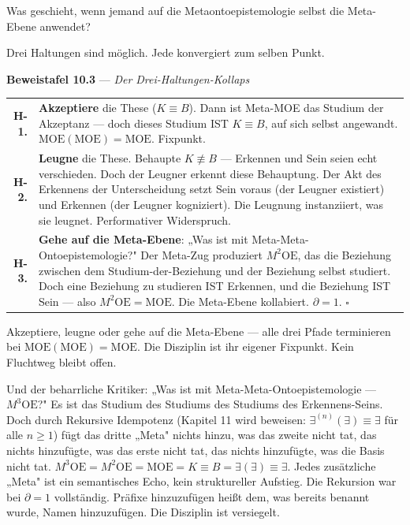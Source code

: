 \documentclass[10pt, openany, oneside]{book}
\renewcommand{\footnotesize}{\fontsize{8.5}{11}\selectfont}
\begin{document}
\vspace{1em}

\noindent Was geschieht, wenn jemand auf die Metaontoepistemologie selbst die Meta-Ebene anwendet?

Drei Haltungen sind möglich. Jede konvergiert zum selben Punkt.

\vspace{0.5em}

\textbf{Beweistafel 10.3} --- \textit{Der Drei-Haltungen-Kollaps}

\vspace{0.5em}

{\footnotesize
\noindent\begin{tabular}{r p{}}
\textbf{H-1.} & \textbf{Akzeptiere} die These ($K \equiv B$). Dann ist Meta-MOE das Studium der Akzeptanz --- doch dieses Studium IST $K \equiv B$, auf sich selbst angewandt. $\text{MOE}(\text{MOE}) = \text{MOE}$. Fixpunkt. \\[0.3em]
\textbf{H-2.} & \textbf{Leugne} die These. Behaupte $K \not\equiv B$ --- Erkennen und Sein seien echt verschieden. Doch der Leugner erkennt diese Behauptung. Der Akt des Erkennens der Unterscheidung setzt Sein voraus (der Leugner existiert) und Erkennen (der Leugner kogniziert). Die Leugnung instanziiert, was sie leugnet. Performativer Widerspruch. \\[0.3em]
\textbf{H-3.} & \textbf{Gehe auf die Meta-Ebene}: „Was ist mit Meta-Meta-Ontoepistemologie?" Der Meta-Zug produziert $M^2\text{OE}$, das die Beziehung zwischen dem Studium-der-Beziehung und der Beziehung selbst studiert. Doch eine Beziehung zu studieren IST Erkennen, und die Beziehung IST Sein --- also $M^2\text{OE} = \text{MOE}$. Die Meta-Ebene kollabiert. $\partial = 1$. $\square$ \\[0.3em]
\end{tabular}
}

\vspace{0.8em}

\noindent Akzeptiere, leugne oder gehe auf die Meta-Ebene --- alle drei Pfade terminieren bei $\text{MOE}(\text{MOE}) = \text{MOE}$. Die Disziplin ist ihr eigener Fixpunkt. Kein Fluchtweg bleibt offen.

Und der beharrliche Kritiker: „Was ist mit Meta-Meta-Ontoepistemologie --- $M^3\text{OE}$?" Es ist das Studium des Studiums des Studiums des Erkennens-Seins. Doch durch Rekursive Idempotenz (Kapitel 11 wird beweisen: $\exists^{(n)}(\exists) \equiv \exists$ für alle $n \geq 1$) fügt das dritte „Meta" nichts hinzu, was das zweite nicht tat, das nichts hinzufügte, was das erste nicht tat, das nichts hinzufügte, was die Basis nicht tat. $M^3\text{OE} = M^2\text{OE} = \text{MOE} = K \equiv B = \exists(\exists) \equiv \exists$. Jedes zusätzliche „Meta" ist ein semantisches Echo, kein struktureller Aufstieg. Die Rekursion war bei $\partial = 1$ vollständig. Präfixe hinzuzufügen heißt dem, was bereits benannt wurde, Namen hinzuzufügen. Die Disziplin ist versiegelt.
\end{document}
